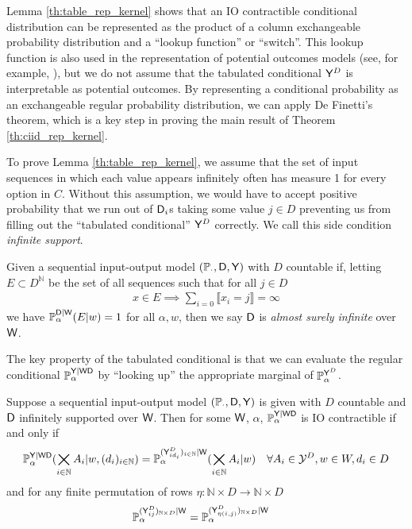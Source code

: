 Lemma \ref{th:table_rep_kernel} shows that an IO contractible conditional distribution can be represented as the product of a column exchangeable probability distribution and a ``lookup function'' or ``switch''. This lookup function is also used in the representation of potential outcomes models (see, for example, \citet{rubin_causal_2005}), but we do not assume that the tabulated conditional $\mathsf{Y}^D$ is interpretable as potential outcomes. By representing a conditional probability as an exchangeable regular probability distribution, we can apply De Finetti's theorem, which is a key step in proving the main result of Theorem \ref{th:ciid_rep_kernel}.

To prove Lemma \ref{th:table_rep_kernel}, we assume that the set of input sequences in which each value appears infinitely often has measure 1 for every option in $C$. Without this assumption, we would have to accept positive probability that we run out of $\mathsf{D}_i$s taking some value $j\in D$ preventing us from filling out the ``tabulated conditional'' $\mathsf{Y}^D$ correctly. We call this side condition \emph{infinite support}.

\begin{definition}\label{def:infinite_support}
Given a sequential input-output model $(\mathbb{P}_\cdot,\mathsf{D},\mathsf{Y})$ with $D$ countable if, letting $E\subset D^{\mathbb{N}}$ be the set of all sequences such that for all $j\in D$
\begin{align}
    x\in E \implies \sum_{i=0}\llbracket x_i = j\rrbracket = \infty
\end{align}
we have $\mathbb{P}_\alpha^{\mathsf{D}|\mathsf{W}}(E|w)=1$ for all $\alpha,w$, then we say $\mathsf{D}$ is \emph{almost surely infinite } over $\mathsf{W}$.
\end{definition}

The key property of the tabulated conditional is that we can evaluate the regular conditional $\mathbb{P}_\alpha^{\mathsf{Y}|\mathsf{WD}}$ by ``looking up'' the appropriate marginal of $\mathbb{P}_\alpha^{\mathsf{Y}^D}$.

\begin{lemma}\label{th:table_rep_kernel}
Suppose a sequential input-output model $(\mathbb{P}_\cdot,\mathsf{D},\mathsf{Y})$ is given with $D$ countable and $\mathsf{D}$ infinitely supported over $\mathsf{W}$. Then for some $\mathsf{W}$, $\alpha$, $\mathbb{P}_\alpha^{\mathsf{Y}|\mathsf{WD}}$ is IO contractible if and only if
\begin{align}
    \mathbb{P}_\alpha^{\mathsf{Y}|\mathsf{WD}}(\bigtimes_{i\in \mathbb{N}}A_i|w,(d_i)_{i\in \mathbb{N}}) &= \mathbb{P}_\alpha^{(\mathsf{Y}^D_{i d_i})_{i\in\mathbb{N}}|\mathsf{W}}(\bigtimes_{i\in \mathbb{N}}A_i|w)&\forall A_i\in \mathcal{Y}^{D}, w\in W, d_i\in D
\end{align}
and for any finite permutation of rows $\eta:\mathbb{N}\times D\to \mathbb{N}\times D$
\begin{align}
    \mathbb{P}_\alpha^{(\mathsf{Y}^D_{ij})_{\mathbb{N}\times D}|\mathsf{W}}&= \mathbb{P}_\alpha^{(\mathsf{Y}^D_{\eta(i,j)})_{\mathbb{N}\times D}|\mathsf{W}}\label{eq:col_exch}
\end{align}
\end{lemma}

